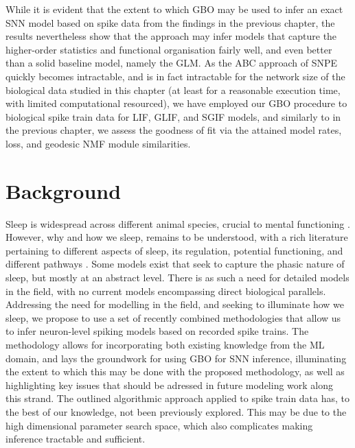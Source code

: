 \documentclass[mphil,deptreport,ianc]{infthesis} %
\begin{document}
While it is evident that the extent to which GBO may be used to infer an exact SNN model based on spike data from the findings in the previous chapter, the results nevertheless show that the approach may infer models that capture the higher-order statistics and functional organisation fairly well, and even better than a solid baseline model, namely the GLM.
As the ABC approach of SNPE quickly becomes intractable, and is in fact intractable for the network size of the biological data studied in this chapter (at least for a reasonable execution time, with limited computational resourced), we have employed our GBO procedure to biological spike train data for LIF, GLIF, and SGIF models, and similarly to in the previous chapter, we assess the goodness of fit via the attained model rates, loss, and geodesic NMF module similarities.

\section{Background}

Sleep is widespread across different animal species, crucial to mental functioning \cite{Brown2012, Walker2018}. 
However, why and how we sleep, remains to be understood, with a rich literature pertaining to different aspects of sleep, its regulation, potential functioning, and different pathways \cite{Borbely1992, Fraigne2015, Brown2012, Herice2019a, Watson2011a, VanDort2015, Hobson2002, Narwade2017, Klinzing2019, Dunmyre2014, Costa2016, Halgren2019, Eban-Rothschild2018, DeVivo2017, Weber2018, Herice2019c, Keene2018, Scammell2017, Cox2016, Grace2014, DinizBehn2010, Anafi2019, Callaway1987, Lim2007, Mallick2001, Ni2016, Pal2007, VanDort2015, Gonzalez2019, Weber2016, Herice2018, Song2019, Pal2005, Tsunematsu2019, Fleshner2011, Datta1997, Buzsaki2015, Theodoni2018, Hoel2021, Hopfield1983, Kinouchi2002, Martinez-Gonzalez2011}. 
Some models exist that seek to capture the phasic nature of sleep, but mostly at an abstract level. 
There is as such a need for detailed models in the field, with no current models encompassing direct biological parallels. Addressing the need for modelling in the field, and seeking to illuminate how we sleep, we propose to use a set of recently combined methodologies that allow us to infer neuron-level spiking models based on recorded spike trains. 
The methodology allows for incorporating both existing knowledge from the ML domain, and lays the groundwork for using GBO for SNN inference, illuminating the extent to which this may be done with the proposed methodology, as well as highlighting key issues that should be adressed in future modeling work along this strand.
The outlined algorithmic approach applied to spike train data has, to the best of our knowledge, not been previously explored. 
This may be due to the high dimensional parameter search space, which also complicates making inference tractable and sufficient.
\end{document}
